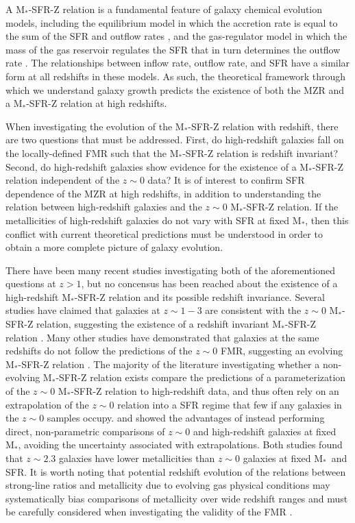\documentclass[iop,twocolappendix]{emulateapj}
\newcommand{\mstar}{$\mbox{M}_*$}
\begin{document}
A \mstar-SFR-Z relation is a fundamental feature of galaxy chemical evolution models, including
 the equilibrium model in which the accretion rate is equal to the sum of the SFR and outflow rates
 \citep{fin08,dav12},
 and the gas-regulator model in which the mass of the gas reservoir regulates the SFR that in turn
 determines the outflow rate \citep{lil13}.
  The relationships between inflow rate, outflow rate, and SFR have a similar form at all redshifts
 in these models.
  As such, the theoretical framework through which we understand galaxy growth predicts the existence
 of both the MZR and a \mstar-SFR-Z relation at high redshifts.

When investigating the evolution of the \mstar-SFR-Z relation with redshift, there are two
 questions that must be addressed.
  First, do high-redshift
 galaxies fall on the locally-defined FMR such that the \mstar-SFR-Z relation is redshift invariant?
  Second, do high-redshift galaxies show evidence for the
 existence of a \mstar-SFR-Z relation independent of the $z\sim0$ data?
  It is of interest to confirm SFR dependence of the MZR at high redshifts, in addition to understanding
 the relation between high-redshift galaxies and the $z\sim0$ \mstar-SFR-Z relation.  If the
 metallicities of high-redshift galaxies do not vary with SFR at fixed \mstar, then
 this conflict with current theoretical predictions must be understood in order to obtain
 a more complete picture of galaxy evolution.

There have been many recent studies investigating both of the aforementioned
 questions at $z>1$, but no concensus has been reached about the existence of a high-redshift \mstar-SFR-Z
 relation and its possible redshift invariance.
  Several studies have claimed that galaxies at $z\sim1-3$ are consistent with the $z\sim0$ \mstar-SFR-Z
 relation, suggesting the existence of a redshift invariant \mstar-SFR-Z relation
 \citep{chr12,wuy12,wuy16,bel13,hen13b,sto13,mai14,yab15,hun16a}.
  Many other studies have demonstrated that galaxies at the same redshifts do not follow the
 predictions of the $z\sim0$ FMR, suggesting an evolving \mstar-SFR-Z relation
 \citep{cul14,yab14,zah14b,wuy14,san15,sal15,gra16,kas17}.
  The majority of the literature investigating whether a non-evolving \mstar-SFR-Z relation exists compare
 the predictions of a parameterization of the $z\sim0$ \mstar-SFR-Z relation to high-redshift data,
 and thus often rely on an extrapolation of the $z\sim0$ relation into a SFR regime that few
 if any galaxies in the $z\sim0$ samples occupy.  \citet{san15} and \citet{sal15} showed the
 advantages of instead performing direct, non-parametric comparisons of $z\sim0$ and high-redshift
 galaxies at fixed \mstar, avoiding the uncertainty associated with extrapolations.
  Both studies found that $z\sim2.3$ galaxies have lower metallicities than $z\sim0$ galaxies at
 fixed \mstar\ and SFR.
  It is worth noting that potential redshift evolution of the relations between strong-line ratios and metallicity
 due to evolving gas physical conditions may systematically bias comparisons of metallicity
 over wide redshift ranges and must be carefully considered when investigating the validity of the
 FMR \citep{ste14,ste16,sha15,san16a}.
\end{document}
